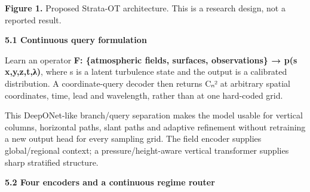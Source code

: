\documentclass[
]{article}
\begin{document}
\textbf{Figure 1.} Proposed Strata-OT architecture. This is a research
design, not a reported result.

\textbf{5.1 Continuous query formulation}

Learn an operator \textbf{F: \{atmospheric fields, surfaces,
observations\} → p(s \textbar{} x,y,z,t,λ)}, where s is a latent
turbulence state and the output is a calibrated distribution. A
coordinate-query decoder then returns Cₙ² at arbitrary spatial
coordinates, time, lead and wavelength, rather than at one hard-coded
grid.

This DeepONet-like branch/query separation makes the model usable for
vertical columns, horizontal paths, slant paths and adaptive refinement
without retraining a new output head for every sampling grid. The field
encoder supplies global/regional context; a pressure/height-aware
vertical transformer supplies sharp stratified structure.

\textbf{5.2 Four encoders and a continuous regime router}
\end{document}
